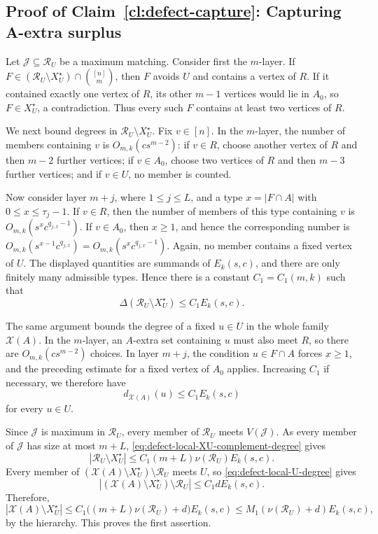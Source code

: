 \documentclass[10pt,a4paper]{article}
\numberwithin{equation}{section}
\theoremstyle{definition}
\newcommand{\X}{\mathcal X}
\newcommand{\Rcal}{\mathcal R}
\begin{document}
\subsection{Proof of Claim~\ref{cl:defect-capture}: Capturing A-extra surplus}


Let $\mathcal J\subseteq\Rcal_U$ be a maximum matching.
Consider first the $m$-layer.  If
$F\in(\Rcal_U\setminus X_U^\star)\cap\binom{[n]}m$, then $F$
avoids $U$ and contains a vertex of $R$.  If it
contained exactly one vertex of $R$, its other $m-1$ vertices
would lie in $A_0$, so $F\in X_U^\star$, a contradiction.
Thus every such $F$ contains at least two vertices of $R$.

We next bound degrees in $\Rcal_U\setminus X_U^\star$.  Fix
$v\in[n]$.  In the $m$-layer, the number of members containing
$v$ is $O_{m,k}(cs^{m-2})$: if $v\in R$, choose another vertex
of $R$ and then $m-2$ further vertices; if $v\in A_0$, choose
two vertices of $R$ and then $m-3$ further vertices; and if
$v\in U$, no member is counted.

Now consider layer $m+j$, where $1\le j\le L$, and a type
$x=|F\cap A|$ with $0\le x\le\tau_j-1$.
If $v\in R$, then the number of members of this type containing $v$ is $O_{m,k}(s^xc^{q_{j,x}-1})$.
If $v\in A_0$, then $x\ge1$, and hence the corresponding number is $O_{m,k}(s^{x-1}c^{q_{j,x}})=O_{m,k}(s^xc^{q_{j,x}-1})$.
Again, no member contains a fixed vertex of
$U$.
The displayed quantities are summands of $E_k(s,c)$, and
there are only finitely many admissible types.  Hence there is a constant $C_1=C_1(m,k)$ such that
\begin{equation}\label{eq:defect-local-XU-complement-degree}
        \Delta(\Rcal_U\setminus X_U^\star)
        \le C_1E_k(s,c).
\end{equation}

The same argument bounds the degree of a fixed $u\in U$ in the
whole family $\X(A)$.  In the $m$-layer, an $A$-extra set
containing $u$ must also meet $R$, so there are
$O_{m,k}(cs^{m-2})$ choices.  In layer $m+j$, the condition
$u\in F\cap A$ forces $x\ge1$, and the preceding estimate for a
fixed vertex of $A_0$ applies.  Increasing $C_1$ if necessary,
we therefore have
\begin{equation}\label{eq:defect-local-U-degree}
        d_{\X(A)}(u)\le C_1E_k(s,c)
\end{equation}
for every $u\in U$.

Since $\mathcal J$ is maximum in $\Rcal_U$, every member of
$\Rcal_U$ meets $V(\mathcal J)$.  As every member of
$\mathcal J$ has size at most $m+L$,
\eqref{eq:defect-local-XU-complement-degree} gives
\[
        |\Rcal_U\setminus X_U^\star|
        \le C_1(m+L)\nu(\Rcal_U)E_k(s,c).
\]
Every member of
$(\X(A)\setminus X_U^\star)\setminus\Rcal_U$ meets $U$, so
\eqref{eq:defect-local-U-degree} gives
\[
        |(\X(A)\setminus X_U^\star)\setminus\Rcal_U|
        \le C_1dE_k(s,c).
\]
Therefore,
\[
        |\X(A)\setminus X_U^\star|
        \le
        C_1\bigl((m+L)\nu(\Rcal_U)+d\bigr)E_k(s,c)
        \le
        M_1(\nu(\Rcal_U)+d)E_k(s,c),
\]
by the hierarchy.  This proves the first assertion.
\end{document}
